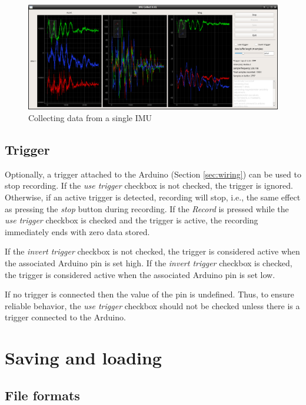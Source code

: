 \documentclass[11pt,letterpaper,article,oneside]{memoir}
\begin{document}
\begin{figure}[]
    \begin{center}
        \includegraphics[width=\textwidth]{screenshot_plots}
    \end{center}
    \caption{Collecting data from a single IMU} 
\end{figure}



\section{Trigger}
\label{sec:trigger}

Optionally, a trigger attached to the Arduino (Section \ref{sec:wiring}) can be
used to stop recording.  If the \emph{use trigger} checkbox is not checked, the
trigger is ignored. Otherwise, if an active trigger is detected, recording will
stop, i.e., the same effect as pressing the \emph{stop} button during recording.
If the \emph{Record} is pressed while the \emph{use trigger} checkbox is checked
and the trigger is active, the recording immediately ends with zero data stored.

If the \emph{invert trigger} checkbox is not checked, the trigger is considered
active when the associated Arduino pin is set high. If the \emph{invert trigger}
checkbox is checked, the trigger is considered active when the associated
Arduino pin is set low.

If no trigger is connected then the value of the pin is undefined.  Thus, to
ensure reliable behavior, the \emph{use trigger} checkbox should not be checked
unless there is a trigger connected to the Arduino.



\chapter{Saving and loading}
\label{sec:savingloading}

\section{File formats}
\end{document}
